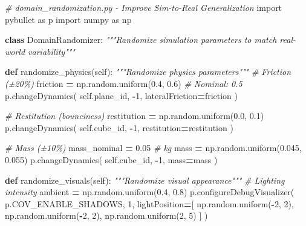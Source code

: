 \documentclass[
]{article}
\newenvironment{Shaded}{\begin{snugshade}}{\end{snugshade}}
\newcommand{\CommentTok}[1]{\textcolor[rgb]{0.56,0.35,0.01}{\textit{#1}}}
\newcommand{\DecValTok}[1]{\textcolor[rgb]{0.00,0.00,0.81}{#1}}
\newcommand{\FloatTok}[1]{\textcolor[rgb]{0.00,0.00,0.81}{#1}}
\newcommand{\ImportTok}[1]{#1}
\newcommand{\KeywordTok}[1]{\textcolor[rgb]{0.13,0.29,0.53}{\textbf{#1}}}
\newcommand{\NormalTok}[1]{#1}
\newcommand{\OperatorTok}[1]{\textcolor[rgb]{0.81,0.36,0.00}{\textbf{#1}}}
\newcommand{\VariableTok}[1]{\textcolor[rgb]{0.00,0.00,0.00}{#1}}
\begin{document}
\begin{Shaded}
\begin{Highlighting}[]
\CommentTok{\# domain\_randomization.py {-} Improve Sim{-}to{-}Real Generalization}
\ImportTok{import}\NormalTok{ pybullet }\ImportTok{as}\NormalTok{ p}
\ImportTok{import}\NormalTok{ numpy }\ImportTok{as}\NormalTok{ np}

\KeywordTok{class}\NormalTok{ DomainRandomizer:}
    \CommentTok{"""Randomize simulation parameters to match real{-}world variability"""}

    \KeywordTok{def}\NormalTok{ randomize\_physics(}\VariableTok{self}\NormalTok{):}
        \CommentTok{"""Randomize physics parameters"""}
        \CommentTok{\# Friction (±20\%)}
\NormalTok{        friction }\OperatorTok{=}\NormalTok{ np.random.uniform(}\FloatTok{0.4}\NormalTok{, }\FloatTok{0.6}\NormalTok{)  }\CommentTok{\# Nominal: 0.5}
\NormalTok{        p.changeDynamics(}
            \VariableTok{self}\NormalTok{.plane\_id,}
            \OperatorTok{{-}}\DecValTok{1}\NormalTok{,}
\NormalTok{            lateralFriction}\OperatorTok{=}\NormalTok{friction}
\NormalTok{        )}

        \CommentTok{\# Restitution (bounciness)}
\NormalTok{        restitution }\OperatorTok{=}\NormalTok{ np.random.uniform(}\FloatTok{0.0}\NormalTok{, }\FloatTok{0.1}\NormalTok{)}
\NormalTok{        p.changeDynamics(}
            \VariableTok{self}\NormalTok{.cube\_id,}
            \OperatorTok{{-}}\DecValTok{1}\NormalTok{,}
\NormalTok{            restitution}\OperatorTok{=}\NormalTok{restitution}
\NormalTok{        )}

        \CommentTok{\# Mass (±10\%)}
\NormalTok{        mass\_nominal }\OperatorTok{=} \FloatTok{0.05}  \CommentTok{\# kg}
\NormalTok{        mass }\OperatorTok{=}\NormalTok{ np.random.uniform(}\FloatTok{0.045}\NormalTok{, }\FloatTok{0.055}\NormalTok{)}
\NormalTok{        p.changeDynamics(}
            \VariableTok{self}\NormalTok{.cube\_id,}
            \OperatorTok{{-}}\DecValTok{1}\NormalTok{,}
\NormalTok{            mass}\OperatorTok{=}\NormalTok{mass}
\NormalTok{        )}

    \KeywordTok{def}\NormalTok{ randomize\_visuals(}\VariableTok{self}\NormalTok{):}
        \CommentTok{"""Randomize visual appearance"""}
        \CommentTok{\# Lighting intensity}
\NormalTok{        ambient }\OperatorTok{=}\NormalTok{ np.random.uniform(}\FloatTok{0.4}\NormalTok{, }\FloatTok{0.8}\NormalTok{)}
\NormalTok{        p.configureDebugVisualizer(}
\NormalTok{            p.COV\_ENABLE\_SHADOWS, }\DecValTok{1}\NormalTok{,}
\NormalTok{            lightPosition}\OperatorTok{=}\NormalTok{[}
\NormalTok{                np.random.uniform(}\OperatorTok{{-}}\DecValTok{2}\NormalTok{, }\DecValTok{2}\NormalTok{),}
\NormalTok{                np.random.uniform(}\OperatorTok{{-}}\DecValTok{2}\NormalTok{, }\DecValTok{2}\NormalTok{),}
\NormalTok{                np.random.uniform(}\DecValTok{2}\NormalTok{, }\DecValTok{5}\NormalTok{)}
\NormalTok{            ]}
\NormalTok{        )}


\end{Highlighting}
\end{Shaded}
\end{document}
